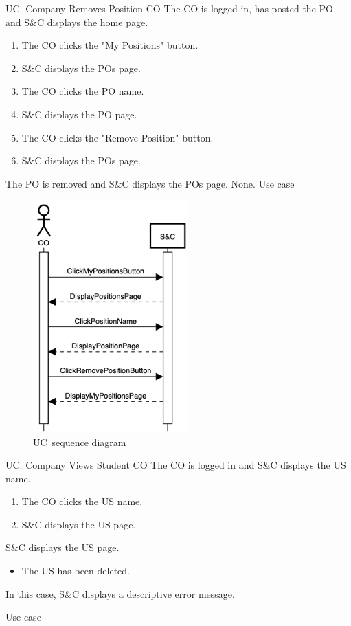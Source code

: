 
\clearpage
\begin{usecase}
    {UC\theuc. Company Removes Position}
    {CO}
    {The CO is logged in, has posted the PO and S\&C displays the home page.}
    {\begin{enumerate}[leftmargin=*]
        \item The CO clicks the "My Positions" button.
        \item S\&C displays the POs page.
        \item The CO clicks the PO name.
        \item S\&C displays the PO page.
        \item The CO clicks the "Remove Position" button.
        \item S\&C displays the POs page.
    \end{enumerate}}
    {The PO is removed and S\&C displays the POs page.}
    {None.}
    {Use case \theuc}
\end{usecase}

\begin{figure}[h]
    \centering
    \includegraphics[width=6cm]{images/sequence-diagrams/company-removes-position.png}
    \caption{UC\theuc\ sequence diagram}
\end{figure}


\clearpage
\begin{usecase}
    {UC\theuc. Company Views Student}
    {CO}
    {The CO is logged in and S\&C displays the US name.}
    {\begin{enumerate}[leftmargin=*]
        \item The CO clicks the US name.
        \item S\&C displays the US page.
    \end{enumerate}}
    {S\&C displays the US page.}
    {\begin{itemize}[leftmargin=*, label=\tiny\textbullet]
        \item The US has been deleted.
    \end{itemize}
    In this case, S\&C displays a descriptive error message.}
    {Use case \theuc}
\end{usecase}

